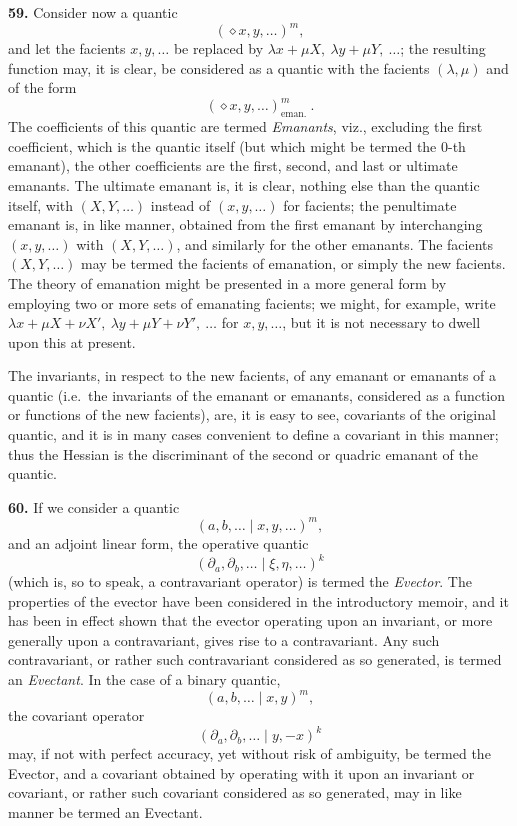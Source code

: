\documentclass[11pt]{article}
\begin{document}
\medskip

\noindent\textbf{59.} Consider now a quantic
\[
(\diamond x, y, \ldots)^m,
\]
and let the facients $x, y, \ldots$ be replaced by $\lambda x + \mu X,\ \lambda y + \mu Y,\ \ldots$; the resulting function may, it is clear, be considered as a quantic with the facients $(\lambda, \mu)$ and of the form
\[
(\diamond x, y, \ldots)^m_{\text{eman.}}\ .
\]
The coefficients of this quantic are termed \textit{Emanants}, viz., excluding the first coefficient, which is the quantic itself (but which might be termed the 0-th emanant), the other coefficients are the first, second, and last or ultimate emanants. The ultimate emanant is, it is clear, nothing else than the quantic itself, with $(X, Y, \ldots)$ instead of $(x, y, \ldots)$ for facients; the penultimate emanant is, in like manner, obtained from the first emanant by interchanging $(x, y, \ldots)$ with $(X, Y, \ldots)$, and similarly for the other emanants. The facients $(X, Y, \ldots)$ may be termed the facients of emanation, or simply the new facients. The theory of emanation might be presented in a more general form by employing two or more sets of emanating facients; we might, for example, write $\lambda x + \mu X + \nu X',\ \lambda y + \mu Y + \nu Y',\ \ldots$ for $x, y, \ldots$, but it is not necessary to dwell upon this at present.

\medskip

The invariants, in respect to the new facients, of any emanant or emanants of a quantic (i.e.\ the invariants of the emanant or emanants, considered as a function or functions of the new facients), are, it is easy to see, covariants of the original quantic, and it is in many cases convenient to define a covariant in this manner; thus the Hessian is the discriminant of the second or quadric emanant of the quantic.

\medskip

\noindent\textbf{60.} If we consider a quantic
\[
(a, b, \ldots \mid x, y, \ldots)^m,
\]
and an adjoint linear form, the operative quantic
\[
(\partial_a, \partial_b, \ldots \mid \xi, \eta, \ldots)^k
\]
(which is, so to speak, a contravariant operator) is termed the \textit{Evector}. The properties of the evector have been considered in the introductory memoir, and it has been in effect shown that the evector operating upon an invariant, or more generally upon a contravariant, gives rise to a contravariant. Any such contravariant, or rather such contravariant considered as so generated, is termed an \textit{Evectant}. In the case of a binary quantic,
\[
(a, b, \ldots \mid x, y)^m,
\]
the covariant operator
\[
(\partial_a, \partial_b, \ldots \mid y, -x)^k
\]
may, if not with perfect accuracy, yet without risk of ambiguity, be termed the Evector, and a covariant obtained by operating with it upon an invariant or covariant, or rather such covariant considered as so generated, may in like manner be termed an Evectant.
\end{document}
